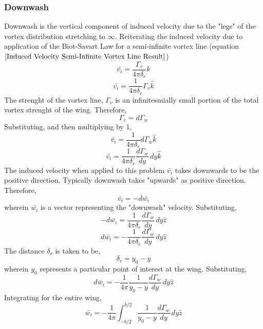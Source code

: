 \documentclass[a4paper, 12pt]{report}
\begin{document}
\begin{center}
\subsubsection{Downwash}
\begin{comment}
\end{comment}
Downwash is the vertical component of induced velocity due to the "legs" of the vortex distribution stretching to $\infty$. Reiterating the induced velocity due to application of the Biot-Savart Law for a semi-infinite vortex line (equation $\ref{Induced Velocity Semi-Infinite Vortex Line Result}$)
$$\bar{v_{i}} = \frac{\Gamma_{v}}{4\pi\delta_{r}}\hat{k}$$
$$\bar{v_{i}} = \frac{1}{4\pi\delta_{r}}\Gamma_{v}\hat{k}$$
The strenght of the vortex line, $\Gamma_{v}$ is an infinitesmially small portion of the total vortex strenght of the wing. Therefore,
$$\Gamma_{v} = d\Gamma_{w}$$
Substituting, and then multiplying by $1$,
$$\bar{v_{i}} = \frac{1}{4\pi\delta_{r}}d\Gamma_{w}\hat{k}$$
$$\bar{v_{i}} = \frac{1}{4\pi\delta_{r}}\frac{d\Gamma_{w}}{dy} \,dy\hat{k}$$
The induced velocity when applied to this problem $\bar{v_{i}}$ takes downwards to be the positive direction. Typically downwash takes "upwards" as positive direction. Therefore,
$$\bar{v_{i}} = -d\bar{w_{i}}$$
wherein $\bar{w_{i}}$ is a vector representing the "downwash" velocity. Substituting,
$$-d\bar{w_{i}} = \frac{1}{4\pi\delta_{r}}\frac{d\Gamma_{w}}{dy} \,dy\hat{z}$$
$$d\bar{w_{i}} = -\frac{1}{4\pi\delta_{r}}\frac{d\Gamma_{w}}{dy} \,dy\hat{z}$$
The distance $\delta_{r}$ is taken to be,
$$\delta_{r} = y_{0}-y$$
wherein $y_{0}$ represents a particular point of interest at the wing. Substituting,
$$d\bar{w_{i}} = -\frac{1}{4\pi}\frac{1}{y_{0}-y}\frac{d\Gamma_{w}}{dy} \,dy\hat{z}$$
Integrating for the entire wing,
\begin{equation}
\bar{w_{i}} = -\frac{1}{4\pi} \int^{b/2}_{-b/2}\frac{1}{y_{0}-y}\frac{d\Gamma_{w}}{dy} \,dy\hat{z}
\label{Downwash in Lifting Line Theory}
\end{equation}


\end{center}
\end{document}
